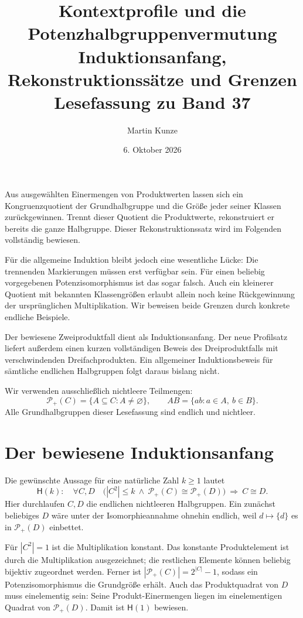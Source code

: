 \documentclass[a4paper,11pt]{article}
\title{Kontextprofile und die Potenzhalbgruppenvermutung\\[.5em]
\large Induktionsanfang, Rekonstruktionssätze und Grenzen\\Lesefassung zu Band 37}
\author{Martin Kunze}
\date{6. Oktober 2026}
\newcommand{\Pp}[1]{\mathcal P_+(#1)}
\begin{document}
\maketitle

Aus ausgewählten Einermengen von Produktwerten lassen sich ein
Kongruenzquotient der Grundhalbgruppe und die Größe jeder seiner
Klassen zurückgewinnen. Trennt dieser Quotient die Produktwerte,
rekonstruiert er bereits die ganze Halbgruppe. Dieser
Rekonstruktionssatz wird im Folgenden vollständig bewiesen.

Für die allgemeine Induktion bleibt jedoch eine wesentliche Lücke:
Die trennenden Markierungen müssen erst verfügbar sein. Für einen
beliebig vorgegebenen Potenzisomorphismus ist das sogar falsch.
Auch ein kleinerer Quotient mit bekannten Klassengrößen erlaubt
allein noch keine Rückgewinnung der ursprünglichen Multiplikation.
Wir beweisen beide Grenzen durch konkrete endliche Beispiele.

Der bewiesene Zweiproduktfall dient als Induktionsanfang. Der neue
Profilsatz liefert außerdem einen kurzen vollständigen Beweis des
Dreiproduktfalls mit verschwindenden Dreifachprodukten. Ein allgemeiner
Induktionsbeweis für sämtliche endlichen Halbgruppen folgt daraus
bislang nicht.

Wir verwenden ausschließlich nichtleere Teilmengen:
\[
 \Pp C=\{A\subseteq C:A\ne\varnothing\},\qquad
 AB=\{ab:a\in A,\ b\in B\}.
\]
Alle Grundhalbgruppen dieser Lesefassung sind endlich und nichtleer.

\section{Der bewiesene Induktionsanfang}

Die gewünschte Aussage für eine natürliche Zahl \(k\ge1\) lautet
\[
 \mathsf H(k):\quad
 \forall C,D\quad
 \bigl(|C^2|\le k\ \land\ \Pp C\cong\Pp D\bigr)
 \ \Longrightarrow\ C\cong D.
\]
Hier durchlaufen \(C,D\) die endlichen nichtleeren Halbgruppen.
Ein zunächst beliebiges \(D\) wäre unter der Isomorphieannahme
ohnehin endlich, weil \(d\mapsto\{d\}\) es in \(\Pp D\) einbettet.

Für \(|C^2|=1\) ist die Multiplikation konstant. Das konstante
Produktelement ist durch die Multiplikation ausgezeichnet; die
restlichen Elemente können beliebig bijektiv zugeordnet werden.
Ferner ist \(|\Pp C|=2^{|C|}-1\), sodass ein Potenzisomorphismus
die Grundgröße erhält. Auch das Produktquadrat von \(D\) muss
einelementig sein: Seine Produkt-Einermengen liegen im einelementigen
Quadrat von \(\Pp D\). Damit ist \(\mathsf H(1)\) bewiesen.
\end{document}
